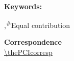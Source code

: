 \makeatletter
{}
\thispagestyle{empty}

\vfill

\ifx\PDGauthors\undefined\let\PDGauthors\authors\fi

    \begin{minipage}[t]{.9\textwidth}
        \normalsize\setlength{\parskip}{3ex}
        \def\IsEqualContrib{\textsuperscript{$\#$,}\global\cdr@hasequalcontribtrue}

        {\raggedright\Huge\bf\@title\par}

        {\raggedright\LARGE\let\footnotesize=\normalsize\cdr@listauthors@footnotes\par}


        {\Large\url@sfstyle\printDOI}

        \\[1ex]
        \normalsize{\setlength{\parskip}{0ex}\@abstract\par}

        \ifx\@empty\@keywords\else\textbf{Keywords:} \@keywords\par\fi

        \footnotesize\cdr@listaddresses@footnotes
        \ifcdr@hasequalcontrib,\quad\textsuperscript{$\#$}Equal contribution\par\fi
        
        \normalsize\textbf{Correspondence}\\
        {\url@sfstyle\url{\thePCIcorresp}}

    \end{minipage}


\vfill\restoregeometry
